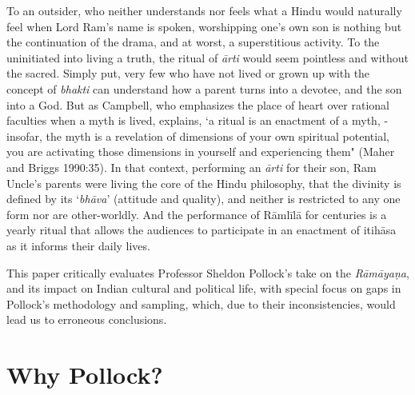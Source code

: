 To an outsider, who neither understands nor feels what a Hindu would naturally feel when Lord Ram’s name is spoken, worshipping one's own son is nothing but the continuation of the drama, and at worst, a superstitious activity. To the uninitiated into living a truth, the ritual of \textit{ārti} would seem pointless and without the sacred. Simply put, very few who have not lived or grown up with the concept of \textit{bhakti} can understand how a parent turns into a devotee, and the son into a God. But as Campbell, who emphasizes the place of heart over rational faculties when a myth is lived, explains, ‘a ritual is an enactment of a myth, - insofar, the myth is a revelation of dimensions of your own spiritual potential, you are activating those dimensions in yourself and experiencing them" (Maher and Briggs 1990:35). In that context, performing an \textit{ārti} for their son, Ram Uncle’s parents were living the core of the Hindu philosophy, that the divinity is defined by its ‘\textit{bhāva}’ (attitude and quality), and neither is restricted to any one form nor are other-worldly. And the performance of Rāmlīlā for centuries is a yearly ritual that allows the audiences to participate in an enactment of itihāsa as it informs their daily lives.

This paper critically evaluates Professor Sheldon Pollock’s take on the \textit{Rāmāyaṇa}, and its impact on Indian cultural and political life, with special focus on gaps in Pollock’s methodology and sampling, which, due to their inconsistencies, would lead us to erroneous conclusions.

\section*{Why Pollock?}

